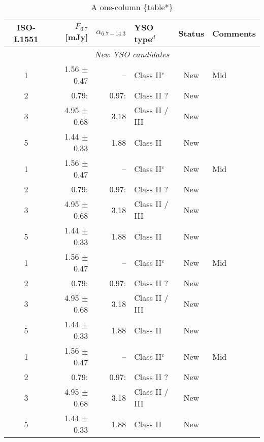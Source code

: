 \documentclass{aa}
\begin{document}
\begin{appendix}
\begin{table*}[h!]
\caption {A one-column \{table*\} \newline}
\label{table:2} 
\centering
\begin{tabular}{crrlcl}
\hline\hline             
ISO-L1551 & $F_{6.7}$~[mJy] & $\alpha_{6.7-14.3}$
& YSO type$^{d}$ & Status & Comments\\
\hline
   \multicolumn{6}{c}{\it New YSO candidates}\\ %
\hline
   1 & 1.56 $\pm$ 0.47 & --    & Class II$^{c}$ & New & Mid\\
   2 & 0.79:           & 0.97: & Class II ?     & New & \\
   3 & 4.95 $\pm$ 0.68 & 3.18  & Class II / III & New & \\
   5 & 1.44 $\pm$ 0.33 & 1.88  & Class II       & New & \\
   1 & 1.56 $\pm$ 0.47 & --    & Class II$^{c}$ & New & Mid\\
   2 & 0.79:           & 0.97: & Class II ?     & New & \\
   3 & 4.95 $\pm$ 0.68 & 3.18  & Class II / III & New & \\
   5 & 1.44 $\pm$ 0.33 & 1.88  & Class II       & New & \\
   1 & 1.56 $\pm$ 0.47 & --    & Class II$^{c}$ & New & Mid\\
   2 & 0.79:           & 0.97: & Class II ?     & New & \\
   3 & 4.95 $\pm$ 0.68 & 3.18  & Class II / III & New & \\
   5 & 1.44 $\pm$ 0.33 & 1.88  & Class II       & New & \\
   1 & 1.56 $\pm$ 0.47 & --    & Class II$^{c}$ & New & Mid\\
   2 & 0.79:           & 0.97: & Class II ?     & New & \\
   3 & 4.95 $\pm$ 0.68 & 3.18  & Class II / III & New & \\
   5 & 1.44 $\pm$ 0.33 & 1.88  & Class II       & New & \\


\end{tabular}
\end{table*}
\end{appendix}
\end{document}
